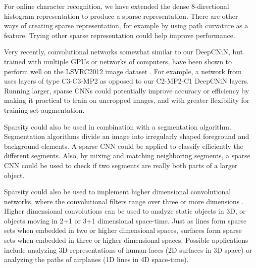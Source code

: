 \documentclass{article}
\numberwithin{equation}{subsection}
\begin{document}
For online character recognition, we have extended the dense 8-directional histogram representation to produce a sparse representation. There are other ways of creating sparse representation, for example by using path curvature as a feature. Trying other sparse representation could help improve performance.

Very recently, convolutional networks somewhat similar to our DeepCNiN, but trained with multiple GPUs or networks of computers, have been shown to perform well on the LSVRC2012 image dataset \cite{VGG2014, GoogLeNet}. For example, a network from \cite{VGG2014} uses layers of type C3-C3-MP2 as opposed to our C2-MP2-C1 DeepCNiN layers. Running larger, sparse CNNs could potentially improve accuracy or efficiency by making it practical to train on uncropped images, and with greater flexibility for training set augmentation.

Sparsity could also be used in combination with a segmentation algorithm. Segmentation algorithms divide an image into irregularly shaped foreground and background elements. A sparse CNN could be applied to classify efficiently the different segments. Also, by mixing and matching neighboring segments, a sparse CNN could be used to check if two segments are really both parts of a larger object.

Sparsity could also be used to implement higher dimensional convolutional networks, where the convolutional filters range over three or more dimensions \cite{3dConvolutions}. Higher dimensional convolutions can be used to analyze static objects in 3D, or objects moving in 2+1 or 3+1 dimensional space-time. Just as lines form sparse sets when embedded in two or higher dimensional spaces, surfaces form sparse sets when embedded in three or higher dimensional spaces. Possible applications include analyzing 3D representations of human faces (2D surfaces in 3D space) or analyzing the paths of airplanes (1D lines in 4D space-time).
\end{document}
